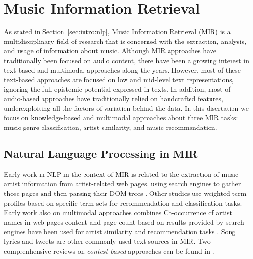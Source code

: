 \section{Music Information Retrieval}
\label{sec:SOA:mir}

As stated in Section~\ref{sec:intro:nlp}, Music Information Retrieval (MIR) is a multidisciplinary field of research that is concerned with the extraction, analysis, and usage of information about music. %
Although MIR approaches have traditionally been focused on audio content, there have been a growing interest in text-based and multimodal approaches along the years. However, most of these text-based approaches are focused on low and mid-level text representations, ignoring the full epistemic potential expressed in texts. In addition, most of audio-based approaches have traditionally relied on handcrafted features, underexploiting all the factors of variation behind the data.
In this disertation we focus on knowledge-based and multimodal approaches about three MIR tasks: music genre classification, artist similarity, and music recommendation.

\subsection{Natural Language Processing in MIR}

Early work in NLP in the context of MIR is related to the extraction of music artist information from artist-related web pages, using search engines to gather those pages and then parsing their DOM trees \cite{Cohen2000}. Other studies \cite{Ellis2002,Whitman2002} use weighted term profiles based on specific term sets for recommendation and classification tasks. 
Early work also on multimodal approaches \cite{} combines 
Co-occurrence of artist names in web pages content and page count based on results provided by search engines have been used for artist similarity and recommendation tasks \cite{Schedl2005}. Song lyrics \cite{} and tweets \cite{Schedl2013a} are other commonly used text sources in MIR. %
Two comprenhensive reviews on \textit{context-based} approaches can be found in \cite{Knees2013, Schedl2014}.

